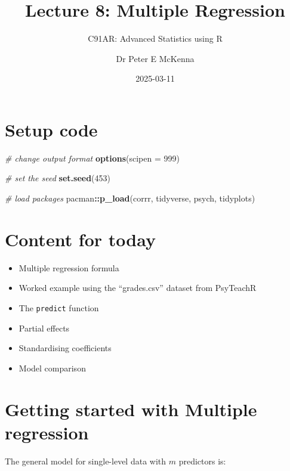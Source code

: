 \documentclass[
]{article}
\title{Lecture 8: Multiple Regression}
\subtitle{C91AR: Advanced Statistics using R}
\author{Dr Peter E McKenna}
\date{2025-03-11}
\newenvironment{Shaded}{\begin{snugshade}}{\end{snugshade}}
\newcommand{\AttributeTok}[1]{\textcolor[rgb]{0.13,0.29,0.53}{#1}}
\newcommand{\CommentTok}[1]{\textcolor[rgb]{0.56,0.35,0.01}{\textit{#1}}}
\newcommand{\DecValTok}[1]{\textcolor[rgb]{0.00,0.00,0.81}{#1}}
\newcommand{\FunctionTok}[1]{\textcolor[rgb]{0.13,0.29,0.53}{\textbf{#1}}}
\newcommand{\NormalTok}[1]{#1}
\newcommand{\SpecialCharTok}[1]{\textcolor[rgb]{0.81,0.36,0.00}{\textbf{#1}}}
\providecommand{\tightlist}{%
  \setlength{\itemsep}{0pt}\setlength{\parskip}{0pt}}
\begin{document}
\maketitle

{
\setcounter{tocdepth}{2}
\tableofcontents
}
\hypertarget{setup-code}{%
\section{Setup code}\label{setup-code}}

\begin{Shaded}
\begin{Highlighting}[]
\CommentTok{\# change output format}
\FunctionTok{options}\NormalTok{(}\AttributeTok{scipen =} \DecValTok{999}\NormalTok{)}

\CommentTok{\# set the seed}
\FunctionTok{set.seed}\NormalTok{(}\DecValTok{453}\NormalTok{)}

\CommentTok{\# load packages}
\NormalTok{pacman}\SpecialCharTok{::}\FunctionTok{p\_load}\NormalTok{(corrr,}
\NormalTok{               tidyverse,}
\NormalTok{               psych,}
\NormalTok{               tidyplots)}
\end{Highlighting}
\end{Shaded}

\hypertarget{content-for-today}{%
\section{Content for today}\label{content-for-today}}

\begin{itemize}
\tightlist
\item
  Multiple regression formula
\item
  Worked example using the ``grades.csv'' dataset from PsyTeachR
\item
  The \texttt{predict} function
\item
  Partial effects
\item
  Standardising coefficients
\item
  Model comparison
\end{itemize}

\hypertarget{getting-started-with-multiple-regression}{%
\section{Getting started with Multiple
regression}\label{getting-started-with-multiple-regression}}

The general model for single-level data with \(m\) predictors is:
\end{document}
